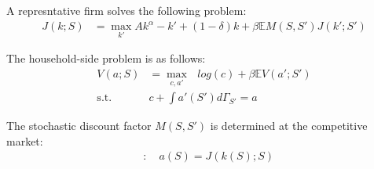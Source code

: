 A represntative firm solves the following problem:
\begin{align*}
  J(k;S) &= \max_{k'} Ak^{\alpha}  -k' + (1-\delta)k + \beta\mathbb{E}M(S,S')J(k';S')
\end{align*}

The household-side problem is as follows:
\begin{align*}
  V(a;S) &= \max_{c,a'}\text{ } log(c) + \beta \mathbb{E}V(a';S')
  \\
  \text{s.t.}\quad& c + \int a'(S') d\Gamma_{S'} =  a
\end{align*}

The stochastic discount factor $M(S,S')$ is determined at the competitive market:
\begin{align*}
  [M]&:\quad a(S) = J(k(S);S)
\end{align*}


